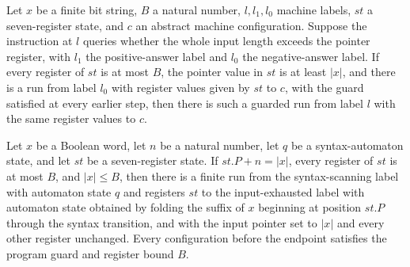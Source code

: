 \begin{lemma}
\label{Complexity.LogProg.TQBFARM.len_f}
\leanok
{}
Let $x$ be a finite bit string, $B$ a natural number, $l,l_1,l_0$ machine labels, $st$ a
seven-register state, and $c$ an abstract machine configuration. Suppose the instruction
at $l$ queries whether the whole input length exceeds the pointer register, with $l_1$
the positive-answer label and $l_0$ the negative-answer label. If every register of $st$
is at most $B$, the pointer value in $st$ is at least $|x|$, and there is a run from
label $l_0$ with register values given by $st$ to $c$, with the guard satisfied at every
earlier step, then there is such a guarded run from label $l$ with the same register
values to $c$.
\end{lemma}

\begin{theorem}
\label{Complexity.LogProg.TQBFARM.syn_run}
\leanok
{}
Let $x$ be a Boolean word, let $n$ be a natural number, let $q$ be a syntax-automaton
state, and let $st$ be a seven-register state. If $st.P+n=|x|$, every register of $st$
is at most $B$, and $|x|\le B$, then there is a finite run from the syntax-scanning
label with automaton state $q$ and registers $st$ to the input-exhausted label with
automaton state obtained by folding the suffix of $x$ beginning at position $st.P$
through the syntax transition, and with the input pointer set to $|x|$ and every other
register unchanged. Every configuration before the endpoint satisfies the program guard
and register bound $B$.
\end{theorem}

